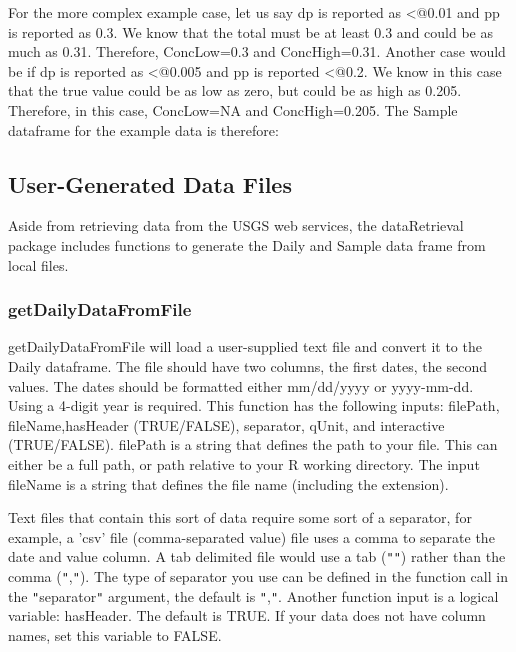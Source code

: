 \documentclass[a4paper,11pt]{article}\usepackage[]{graphicx}\usepackage[]{color}
\begin{document}
For the more complex example case, let us say dp is reported as \verb@<@0.01 and pp is reported as 0.3. We know that the total must be at least 0.3 and could be as much as 0.31. Therefore, ConcLow=0.3 and ConcHigh=0.31. Another case would be if dp is reported as \verb@<@0.005 and pp is reported \verb@<@0.2. We know in this case that the true value could be as low as zero, but could be as high as 0.205. Therefore, in this case, ConcLow=NA and ConcHigh=0.205. The Sample dataframe for the example data is therefore:




\FloatBarrier

\subsection{User-Generated Data Files}
Aside from retrieving data from the USGS web services, the dataRetrieval package includes functions to generate the Daily and Sample data frame from local files.

\subsubsection{getDailyDataFromFile}
getDailyDataFromFile will load a user-supplied text file and convert it to the Daily dataframe. The file should have two columns, the first dates, the second values.  The dates should be formatted either mm/dd/yyyy or yyyy-mm-dd. Using a 4-digit year is required. This function has the following inputs: filePath, fileName,hasHeader (TRUE/FALSE), separator, qUnit, and interactive (TRUE/FALSE). filePath is a string that defines the path to your file. This can either be a full path, or path relative to your R working directory. The input fileName is a string that defines the file name (including the extension).

Text files that contain this sort of data require some sort of a separator, for example, a 'csv' file (comma-separated value) file uses a comma to separate the date and value column. A tab delimited file would use a tab (\texttt{"}\verb@\t@\texttt{"}) rather than the comma (\texttt{"},\texttt{"}). The type of separator you use can be defined in the function call in the \texttt{"}separator\texttt{"} argument, the default is \texttt{"},\texttt{\texttt{"}}. Another function input is a logical variable: hasHeader.  The default is TRUE. If your data does not have column names, set this variable to FALSE.
\end{document}
